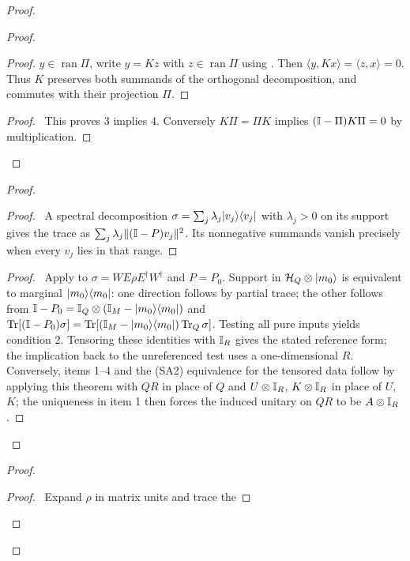 \begin{proof}
\begin{proof}
\begin{proof}
  $y\in\operatorname{ran}\Pi$, write $y=Kz$ with
  $z\in\operatorname{ran}\Pi$ using .
  Then $\langle y,Kx\rangle=\langle z,x\rangle=0$.
  Thus $K$ preserves both summands of the orthogonal decomposition,
  and commutes with their projection $\Pi$.
  \end{proof}
  \qedstep
  \begin{proof}\pf\ This proves 3 implies 4. Conversely
  $K\Pi=\Pi K$ implies $(\mathbb{I}-\Pi)K\Pi=0$ by multiplication.
  \end{proof}
 \end{proof}
 \begin{proof}
  \begin{proof}\pf\ A spectral decomposition
  $\sigma=\sum_j\lambda_j\lvert v_j\rangle\langle v_j\rvert$ with $\lambda_j>0$ on its
  support gives the trace as
  $\sum_j\lambda_j\|(\mathbb{I}-P)v_j\|^2$. Its nonnegative summands
  vanish precisely when every $v_j$ lies in that range.
  \end{proof}
  \qedstep
  \begin{proof}\pf\ Apply  to
  $\sigma=WE\rho E^\dagger W^\dagger$ and $P=P_0$.
  Support in $\mathcal{H}_Q\otimes\lvert m_0\rangle$ is equivalent to marginal
  $\lvert m_0\rangle\langle m_0\rvert$: one direction follows by partial trace; the other
  follows from
  $\mathbb{I}-P_0=\mathbb{I}_Q\otimes(\mathbb{I}_M-\lvert m_0\rangle\langle m_0\rvert)$ and
  $\operatorname{Tr}[(\mathbb{I}-P_0)\sigma]
  =\operatorname{Tr}[(\mathbb{I}_M-\lvert m_0\rangle\langle m_0\rvert)\operatorname{Tr}_Q\sigma]$.
  Testing all pure inputs yields condition 2. Tensoring these
  identities with $\mathbb{I}_R$ gives the stated reference form; the
  implication back to the unreferenced test uses a one-dimensional $R$. Conversely, items 1--4 and the (SA2) equivalence for the tensored data follow by applying this theorem with $QR$ in place of $Q$ and $U\otimes\mathbb{I}_R$, $K\otimes\mathbb{I}_R$ in place of $U$, $K$; the uniqueness in item 1 then forces the induced unitary on $QR$ to be $A\otimes\mathbb{I}_R$.
  \end{proof}
 \end{proof}
 \begin{proof}
  \begin{proof}\pf\ Expand $\rho$ in matrix units and trace the

\end{proof}
\end{proof}
\end{proof}

